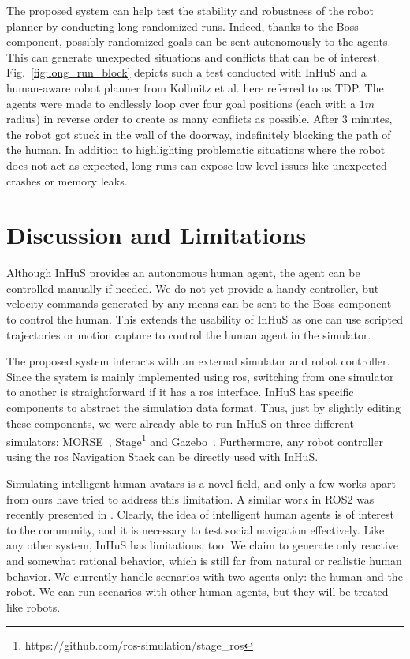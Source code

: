 The proposed system can help test the stability and robustness of the robot planner by conducting long randomized runs. Indeed, thanks to the Boss component, possibly randomized goals can be sent autonomously to the agents. This can generate unexpected situations and conflicts that can be of interest.
Fig.~\ref{fig:long_run_block} depicts such a test conducted with InHuS and a human-aware robot planner from Kollmitz et al. \cite{kollmitz_time_2015} here referred to as TDP. The agents were made to endlessly loop over four goal positions (each with a $1m$ radius) in reverse order to create as many conflicts as possible. After 3 minutes, the robot got stuck in the wall of the doorway, indefinitely blocking the path of the human. In addition to highlighting problematic situations where the robot does not act as expected, long runs can expose low-level issues like unexpected crashes or memory leaks.




\section{Discussion and Limitations}

Although InHuS provides an autonomous human agent, the agent can be controlled manually if needed. We do not yet provide a handy controller, but velocity commands generated by any means can be sent to the Boss component to control the human. This extends the usability of InHuS as one can use scripted trajectories or motion capture to control the human agent in the simulator.

The proposed system interacts with an external simulator and robot controller. Since the system is mainly implemented using \acrshort{ros}, switching from one simulator to another is straightforward if it has a \acrshort{ros} interface. 
InHuS has specific components to abstract the simulation data format. Thus, just by slightly editing these components, we were already able to run InHuS on three different simulators: MORSE~\cite{echeverria2011modular}, Stage\footnote{https://github.com/ros-simulation/stage\_ros} and Gazebo~\cite{koenig2004design}. Furthermore, any robot controller using the \acrshort{ros} Navigation Stack can be directly used with InHuS.

Simulating intelligent human avatars is a novel field, and only a few works apart from ours have tried to address this limitation. A similar work in ROS2 was recently presented in \cite{perezhunavsim}.
Clearly, the idea of intelligent human agents is of interest to the community, and it is necessary to test social navigation effectively. Like any other system, InHuS has limitations, too. We claim to generate only reactive and somewhat rational behavior, which is still far from natural or realistic human behavior. We currently handle scenarios with two agents only: the human and the robot. We can run scenarios with other human agents, but they will be treated like robots.



